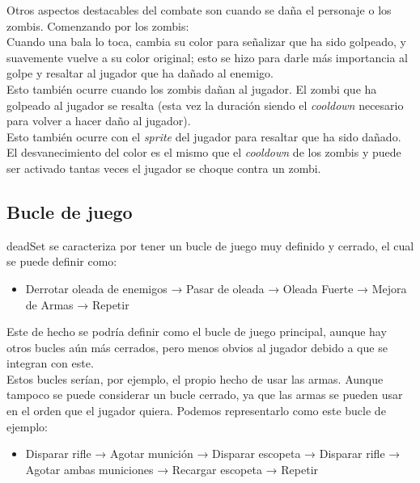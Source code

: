\documentclass[11pt]{article}
\begin{document}
        Otros aspectos destacables del combate son cuando se daña el personaje o los zombis. Comenzando por los zombis:\\
        
        Cuando una bala lo toca, cambia su color para señalizar que ha sido golpeado, y suavemente vuelve a su color original; esto se hizo para darle más importancia al golpe y resaltar al jugador que ha dañado al enemigo.\\ 

        Esto también ocurre cuando los zombis dañan al jugador. El zombi que ha golpeado al jugador se resalta (esta vez la duración siendo el \textit{cooldown} necesario para volver a hacer daño al jugador).\\
        
        Esto también ocurre con el \textit{sprite} del jugador para resaltar que ha sido dañado. El desvanecimiento del color es el mismo que el \textit{cooldown} de los zombis y puede ser activado tantas veces el jugador se choque contra un zombi.\\

        \newpage
        \subsection{Bucle de juego}
        \textunderscore deadSet se caracteriza por tener un bucle de juego muy definido y cerrado, el cual se puede definir como:
        
        \begin{itemize}
            \item Derrotar oleada de enemigos → Pasar de oleada → Oleada Fuerte → Mejora de Armas → Repetir
        \end{itemize}
        Este de hecho se podría definir como el bucle de juego principal, aunque hay otros bucles aún más cerrados, pero menos obvios al jugador debido a que se integran con este.\\
        
        Estos bucles serían, por ejemplo, el propio hecho de usar las armas. Aunque tampoco se puede considerar un bucle cerrado, ya que las armas se pueden usar en el orden que el jugador quiera. Podemos representarlo como este bucle de ejemplo:\\
        \begin{itemize}
            \item Disparar rifle → Agotar munición → Disparar escopeta → Disparar rifle → Agotar ambas municiones → Recargar escopeta → Repetir
        \end{itemize}
\newpage
\end{document}
